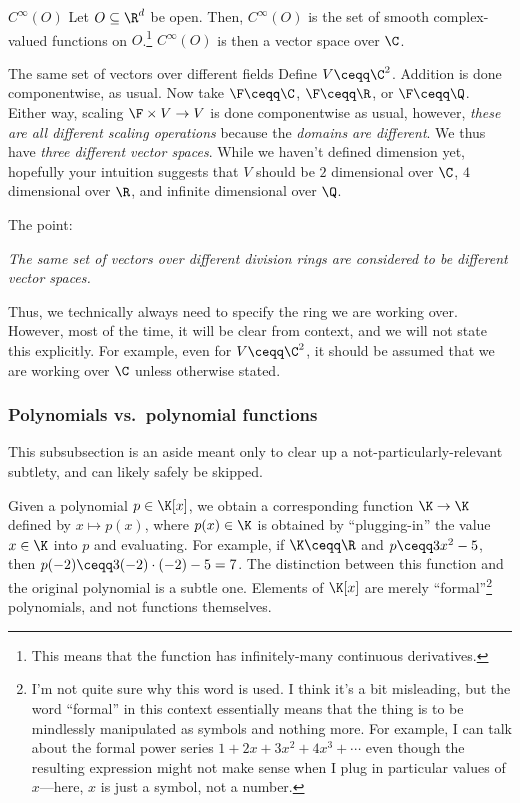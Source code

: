 \begin{exm}{$C^{\infty}(O)$}{}
	Let $O\subseteq \R ^d$ be open.  Then, $C^{\infty}(O)$ is the set of smooth complex-valued functions on $O$.\footnote{This means that the function has infinitely-many continuous derivatives.}  $C^{\infty}(O)$ is then a vector space over $\C$.
\end{exm}
\begin{exm}{The same set of vectors over different fields}{}
	Define $V\ceqq \C ^2$.  Addition is done componentwise, as usual.  Now take $\F \ceqq \C$, $\F \ceqq \R$, or $\F \ceqq \Q$.  Either way, scaling $\F \times V\rightarrow V$ is done componentwise as usual, however, \emph{these are all different scaling operations} because the \emph{domains are different}.  We thus have \emph{three different vector spaces}.  While we haven't defined dimension yet, hopefully your intuition suggests that $V$ should be $2$ dimensional over $\C$, $4$ dimensional over $\R$, and infinite dimensional over $\Q$.
	
	The point:
	\begin{displayquote}
		\emph{The same set of vectors over different division rings are considered to be different vector spaces.}
	\end{displayquote}
	\begin{rmk}
		Thus, we technically always need to specify the ring we are working over.  However, most of the time, it will be clear from context, and we will not state this explicitly.  For example, even for $V\ceqq \C ^2$, it should be assumed that we are working over $\C$ unless otherwise stated.
	\end{rmk}
\end{exm}

\subsubsection{Polynomials vs.~polynomial functions}\label{sss1.1.1}

This subsubsection is an aside meant only to clear up a not-particularly-relevant subtlety, and can likely safely be skipped.

Given a polynomial $p\in \K [x]$, we obtain a corresponding function $\K \rightarrow \K$ defined by $x\mapsto p(x)$, where $p(x)\in \K$ is obtained by ``plugging-in'' the value $x\in \K$ into $p$ and evaluating.  For example, if $\K \ceqq \R$ and $p\ceqq 3x^2-5$, then $p(-2)\ceqq 3(-2)\cdot (-2)-5=7$.  The distinction between this function and the original polynomial is a subtle one.  Elements of $\K [x]$ are merely ``formal''\footnote{I'm not quite sure why this word is used.  I think it's a bit misleading, but the word ``formal'' in this context essentially means that the thing is to be mindlessly manipulated as symbols and nothing more.  For example, I can talk about the formal power series $1+2x+3x^2+4x^3+\cdots$ even though the resulting expression might not make sense when I plug in particular values of $x$---here, $x$ is just a symbol, not a number.} polynomials, and not functions themselves.

